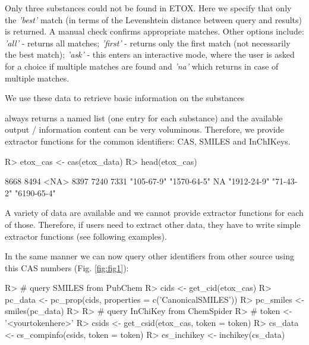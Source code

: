 \documentclass[article, shortnames]{jss}\usepackage[]{graphicx}\usepackage[]{color}
\begin{document}
Only three substances could not be found in ETOX. 
Here we specify that only the \emph{'best'} match (in terms of the Levenshtein distance between query and results) is returned. 
A manual check confirms appropriate matches. 
Other options include: \emph{'all'} - returns all matches; \emph{'first'} - returns only the first match (not necessarily the best match); \emph{'ask'} - this enters an interactive mode, where the user is asked for a choice if multiple matches are found and \emph{'na'} which returns  in case of multiple matches.

We use these data to retrieve basic information on the substances

\begin{CodeChunk}
\end{CodeChunk}

 always returns a named list (one entry for each substance) and the available output / information content can be very voluminous.
Therefore, we provide extractor functions for the common identifiers: CAS, SMILES and InChIKeys.
\begin{CodeChunk}
\begin{CodeInput}
R> etox_cas <- cas(etox_data)
R> head(etox_cas)
\end{CodeInput}
\begin{CodeOutput}
       8668        8494        <NA>        8397        7240        7331 
 "105-67-9" "1570-64-5"          NA "1912-24-9"   "71-43-2" "6190-65-4" 
\end{CodeOutput}
\end{CodeChunk}

A variety of data are available and we cannot provide extractor functions for each of those.
Therefore, if users need to extract other data, they have to write simple extractor functions (see following examples).

In the same manner we can now query other identifiers from other source using this CAS numbers (Fig. \ref{fig:fig1}):


\begin{CodeChunk}
\begin{CodeInput}
R> # query SMILES from PubChem
R> cids <- get_cid(etox_cas)
R> pc_data <- pc_prop(cids, properties = c('CanonicalSMILES'))
R> pc_smiles <- smiles(pc_data)
R> 
R> # query InChiKey from ChemSpider
R> # token <- '<yourtokenhere>'
R> csids <- get_csid(etox_cas, token = token)
R> cs_data <- cs_compinfo(csids, token = token)
R> cs_inchikey <- inchikey(cs_data)
\end{CodeInput}
\end{CodeChunk}
\end{document}
